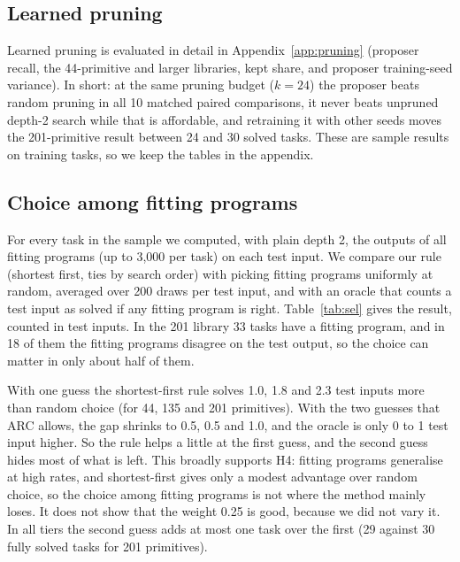 \documentclass[sigconf,nonacm]{acmart}
\begin{document}
\subsection{Learned pruning}

Learned pruning is evaluated in detail in Appendix~\ref{app:pruning} (proposer recall, the 44-primitive and larger libraries, kept share, and proposer training-seed variance). In short: at the same pruning budget ($k=24$) the proposer beats random pruning in all 10 matched paired comparisons, it never beats unpruned depth-2 search while that is affordable, and retraining it with other seeds moves the 201-primitive result between 24 and 30 solved tasks. These are sample results on training tasks, so we keep the tables in the appendix.

\subsection{Choice among fitting programs}
\label{sec:sel}

For every task in the sample we computed, with plain depth 2, the outputs of all fitting programs (up to 3{,}000 per task) on each test input. We compare our rule (shortest first, ties by search order) with picking fitting programs uniformly at random, averaged over 200 draws per test input, and with an oracle that counts a test input as solved if any fitting program is right. Table~\ref{tab:sel} gives the result, counted in test inputs. In the 201 library 33 tasks have a fitting program, and in 18 of them the fitting programs disagree on the test output, so the choice can matter in only about half of them.

\begin{table}[t]
\caption{Choice rule against random choice, plain depth 2, 321 test inputs. Fit: tasks with a fitting program. Rival: tasks whose fitting programs give more than one distinct test output. Counts are test inputs solved; random is an average over 200 draws. The oracle solves 20, 32 and 34 test inputs for the three libraries.}
\label{tab:sel}
\footnotesize\setlength{\tabcolsep}{4pt}

\end{table}

With one guess the shortest-first rule solves 1.0, 1.8 and 2.3 test inputs more than random choice (for 44, 135 and 201 primitives). With the two guesses that ARC allows, the gap shrinks to 0.5, 0.5 and 1.0, and the oracle is only 0 to 1 test input higher. So the rule helps a little at the first guess, and the second guess hides most of what is left. This broadly supports H4: fitting programs generalise at high rates, and shortest-first gives only a modest advantage over random choice, so the choice among fitting programs is not where the method mainly loses. It does not show that the weight 0.25 is good, because we did not vary it. In all tiers the second guess adds at most one task over the first (29 against 30 fully solved tasks for 201 primitives).
\end{document}
